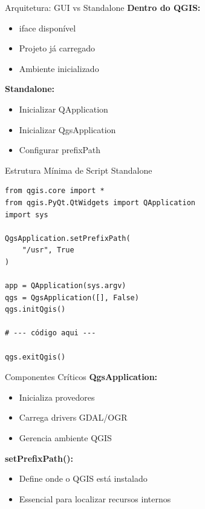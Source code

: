 \documentclass{beamer}
\begin{document}
\begin{frame}{Arquitetura: GUI vs Standalone}
    \textbf{Dentro do QGIS:}
    \begin{itemize}
        \item iface disponível
        \item Projeto já carregado
        \item Ambiente inicializado
    \end{itemize}
    
    \vspace{0.4cm}
    
    \textbf{Standalone:}
    \begin{itemize}
        \item Inicializar QApplication
        \item Inicializar QgsApplication
        \item Configurar prefixPath
    \end{itemize}
\end{frame}

\begin{frame}[fragile]{Estrutura Mínima de Script Standalone}
    \begin{verbatim}
from qgis.core import *
from qgis.PyQt.QtWidgets import QApplication
import sys

QgsApplication.setPrefixPath(
    "/usr", True
)

app = QApplication(sys.argv)
qgs = QgsApplication([], False)
qgs.initQgis()

# --- código aqui ---

qgs.exitQgis()
    \end{verbatim}
\end{frame}

\begin{frame}{Componentes Críticos}
    \textbf{QgsApplication:}
    \begin{itemize}
        \item Inicializa provedores
        \item Carrega drivers GDAL/OGR
        \item Gerencia ambiente QGIS
    \end{itemize}
    
    \vspace{0.4cm}
    
    \textbf{setPrefixPath():}
    \begin{itemize}
        \item Define onde o QGIS está instalado
        \item Essencial para localizar recursos internos
    \end{itemize}
\end{frame}
\end{document}

